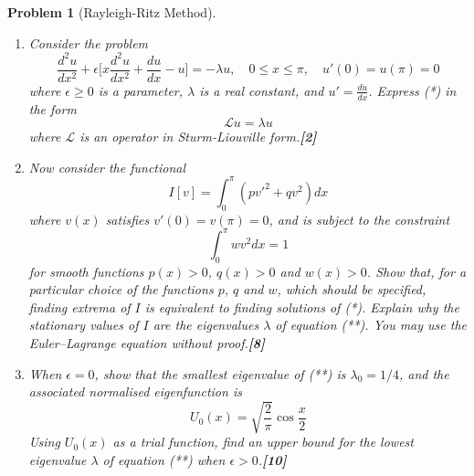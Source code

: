 \documentclass[a4paper]{article}
\theoremstyle{new}
\newtheorem{qns}{Problem}[section]
\begin{document}
\begin{qns}[Rayleigh-Ritz Method]\leavevmode
\begin{enumerate}[label=(\roman*)]
\item Consider the problem
\begin{equation}
    \frac{d^2u}{dx^2}+\epsilon\bigg[x\frac{d^2u}{dx^2}+\frac{du}{dx}-u\bigg]=-\lambda u,\quad0\leq x\leq\pi,\quad u'(0)=u(\pi)=0\tag{*}
\end{equation}
where $\epsilon\geq0$ is a parameter, $\lambda$ is a real constant, and $u'=\frac{du}{dx}$. Express (*) in the form
\begin{equation}
    \mathcal{L}u=\lambda u\tag{**}
\end{equation}
where $\mathcal{L}$ is an operator in Sturm-Liouville form.\hfill\textbf{[2]}
\item Now consider the functional
$$I[v]=\int_0^\pi(pv'^2+qv^2)dx$$
where $v(x)$ satisfies $v'(0) = v(\pi) = 0$, and is subject to the constraint
$$\int_0^\pi wv^2dx=1$$
for smooth functions $p(x) > 0$, $q(x) > 0$ and $w(x) > 0$. Show that, for a particular choice of the functions $p$, $q$ and $w$, which should be specified, finding extrema of $I$ is equivalent to finding solutions of (*). Explain why the stationary values of $I$ are the eigenvalues $\lambda$ of equation (**). You may use the Euler–Lagrange equation without proof.\hfill\textbf{[8]}
\item When $\epsilon=0$, show that the smallest eigenvalue of (**) is $\lambda_0=1/4$, and the associated normalised eigenfunction is
$$U_0(x)=\sqrt{\frac{2}{\pi}}\cos\frac{x}{2}$$
Using $U_0(x)$ as a trial function, find an upper bound for the lowest eigenvalue $\lambda$ of equation (**) when $\epsilon>0$.\hfill\textbf{[10]}
\end{enumerate}
\end{qns}
\end{document}
